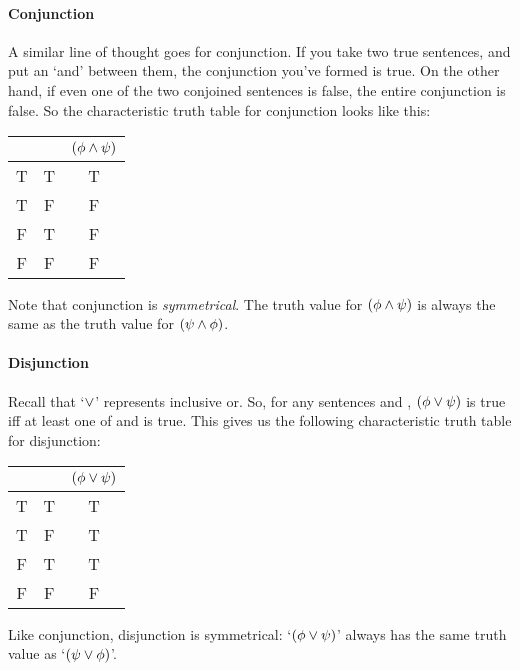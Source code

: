 \paragraph{Conjunction} A similar line of thought goes for conjunction.  If you take two true sentences, and put an `and' between them, the conjunction you've formed is true.  On the other hand, if even one of the two conjoined sentences is false, the entire conjunction is false.    So the {characteristic truth table} for conjunction looks like this:
\begin{center}
\begin{tabular}{c c |c}
\meta{\phi} & \meta{\psi} & $(\mathcal{\phi}\wedge\mathcal{\psi})$\\
\hline
T & T & T\\
T & F & F\\
F & T & F\\
F & F & F
\end{tabular}
\end{center}
Note that conjunction is \emph{symmetrical}. The truth value for $(\mathcal{\phi} \wedge \mathcal{\psi})$ is always the same as the truth value for $(\mathcal{\psi} \wedge \mathcal{\phi})$.



\paragraph{Disjunction} Recall that `$\vee$' represents inclusive or. So, for any sentences \meta{\phi} and \meta{\psi}, $(\mathcal{\phi}\vee \mathcal{\psi})$ is true iff at least one of \meta{\phi} and \meta{\psi} is true. This gives us the following characteristic truth table for disjunction:
\begin{center}
\begin{tabular}{c c|c}
\meta{\phi} & \meta{\psi} & $(\mathcal{\phi}\vee\mathcal{\psi})$ \\
\hline
T & T & T\\
T & F & T\\
F & T & T\\
F & F & F
\end{tabular}
\end{center}
Like conjunction, disjunction is symmetrical: `$(\mathcal{\phi} \vee \mathcal{\psi})$' always has the same truth value as `$(\mathcal{\psi} \vee \mathcal{\phi})$'.

